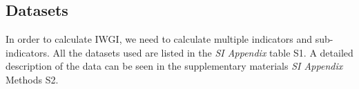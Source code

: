 \documentclass[9pt, twocolumn, twoside, lineno]{pnas-new}
\begin{document}
{		%


	\subsection*{Datasets}
	In order to calculate IWGI, we need to calculate multiple indicators and sub-indicators. All the datasets used are listed in the \textit{SI Appendix} table S1. A detailed description of the data can be seen in the supplementary materials \textit{SI Appendix} Methods S2.
}

\showmatmethods{} %


\showacknow{} %


	
\end{document}

